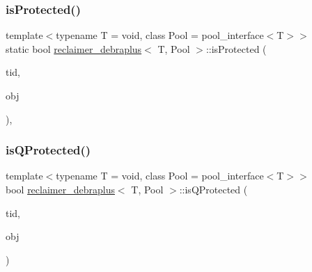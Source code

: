 \mbox{\label{classreclaimer__debraplus_a94a01ba5a46a5c64d47d8008b6f406ad}} 
\subsubsection{\texorpdfstring{is\+Protected()}{isProtected()}}
{\footnotesize\ttfamily template$<$typename T  = void, class Pool  = pool\+\_\+interface$<$\+T$>$$>$ \\
static bool \hyperlink{classreclaimer__debraplus}{reclaimer\+\_\+debraplus}$<$ T, Pool $>$\+::is\+Protected (\begin{DoxyParamCaption}\item[{const int}]{tid,  }\item[{T $\ast$const}]{obj }\end{DoxyParamCaption})\hspace{0.3cm}{\ttfamily [inline]}, {\ttfamily [static]}}

\mbox{\label{classreclaimer__debraplus_ab2108aa83328af20d9edefaa6181f829}} 
\subsubsection{\texorpdfstring{is\+Q\+Protected()}{isQProtected()}}
{\footnotesize\ttfamily template$<$typename T  = void, class Pool  = pool\+\_\+interface$<$\+T$>$$>$ \\
bool \hyperlink{classreclaimer__debraplus}{reclaimer\+\_\+debraplus}$<$ T, Pool $>$\+::is\+Q\+Protected (\begin{DoxyParamCaption}\item[{const int}]{tid,  }\item[{T $\ast$const}]{obj }\end{DoxyParamCaption})\hspace{0.3cm}{\ttfamily [inline]}}

\mbox{\label{classreclaimer__debraplus_a4cf9fd158f9e1fee5f4e518e69d738ca}} 
